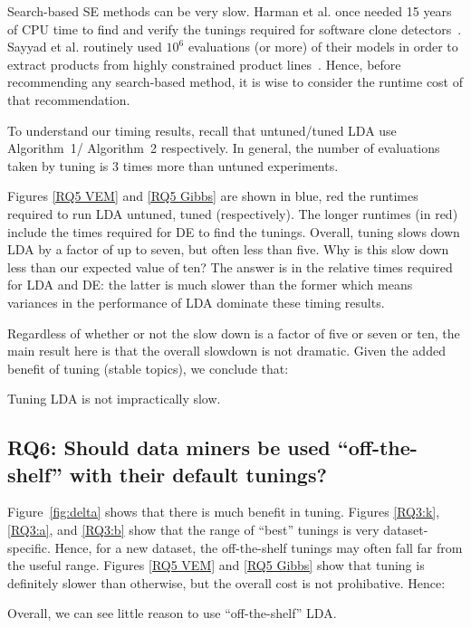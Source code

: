 \documentclass[10pt,conference]{IEEEtran}
\theoremstyle{break}
\begin{document}
Search-based SE methods can be very slow. Harman et al. once needed 15
years of CPU time to find and verify the tunings required for software
clone detectors~\cite{wang2013searching}. Sayyad et al. routinely used
$10^6$ evaluations (or more) of their models in order to extract
products from highly constrained product
lines~\cite{sayyad2013scalable}. Hence, before recommending any
search-based method, it is wise to consider the runtime cost of that
recommendation.


To understand our timing results, recall that untuned/tuned LDA use
Algorithm~1/ Algorithm~2 respectively. In general, the number of evaluations taken by tuning is 3 times more than 
untuned experiments. 


  Figures \ref{RQ5 VEM} and \ref{RQ5 Gibbs} are shown in blue, red the
  runtimes required to run LDA untuned, tuned (respectively).  The
  longer runtimes (in red) include the times required for DE to find
  the tunings. Overall, tuning slows down LDA by a factor of up to
  seven, but often less than five. Why is this slow down less than our expected value of ten?
  The answer is in the relative times required for LDA and DE: the latter is much slower
  than the former which means variances in the performance of LDA dominate these timing results.

  Regardless of whether or not the slow down is a factor of five or seven or ten,
  the main result here is that
  the overall slowdown is not dramatic. Given the added benefit of tuning (stable topics),
  we conclude that:

  \begin{lesson}
    Tuning LDA is not impractically slow.
\end{lesson}

\subsection{\textbf{RQ6: Should data miners be used “off-the-shelf” with their  default  tunings?}}


  Figure~\ref{fig:delta} shows that there is much benefit in tuning.
  Figures \ref{RQ3:k}, \ref{RQ3:a}, and \ref{RQ3:b} show that
  the range of ``best'' tunings is very dataset-specific. Hence, for a new dataset,
  the off-the-shelf tunings
  may often fall far from the useful range.
  Figures \ref{RQ5 VEM} and \ref{RQ5 Gibbs} show that tuning is definitely
  slower than otherwise, but the overall cost is not prohibative.
  Hence:
  \begin{lesson}
    Overall, we can see little reason  to use ``off-the-shelf'' LDA.
    \end{lesson}
\end{document}
